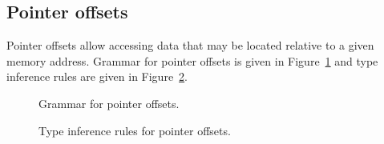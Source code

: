 \subsection{Pointer offsets}\label{fig:nstar-common-expressions-pointeroffsets}

Pointer offsets allow accessing data that may be located relative to a given memory address.
Grammar for pointer offsets is given in Figure~\ref{fig:nstar-common-expressions-pointeroffsets-grammar} and type inference rules are given in Figure~\ref{fig:nstar-common-expressions-pointeroffsets-typerules}.

\begin{figure}[H]
  \centering


  \caption{Grammar for pointer offsets.}
  \label{fig:nstar-common-expressions-pointeroffsets-grammar}
\end{figure}

\begin{figure}[H]
  \centering


  \caption{Type inference rules for pointer offsets.}
  \label{fig:nstar-common-expressions-pointeroffsets-typerules}
\end{figure}

